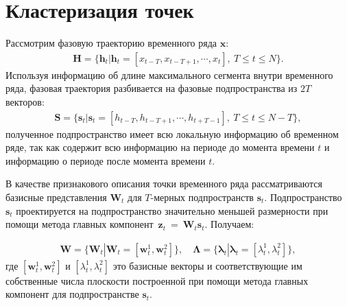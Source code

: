 \documentclass[12pt, twoside]{article}
\numberwithin{equation}{section}
\begin{document}
\section{Кластеризация точек}
Рассмотрим фазовую траекторию временного ряда $\textbf{x}$:
\begin{equation}
\label{eq:cl:1}
\begin{aligned}
\mathbf{H} = \{\textbf{h}_t| \textbf{h}_t = [x_{t-T}, x_{t-T+1}, \cdots, x_{t}],~T\leq t\leq N\}.
\end{aligned}
\end{equation}
Используя информацию об длине максимального сегмента внутри временного ряда, фазовая траектория разбивается на фазовые подпространства из $2T$ векторов:
\begin{equation}
\label{eq:cl:2}
\begin{aligned}
\mathbf{S} = \{\textbf{s}_t| \textbf{s}_t = [h_{t-T}, h_{t-T+1}, \cdots, h_{t+T-1}],~T\leq t\leq N-T\},
\end{aligned}
\end{equation}
полученное подпространство имеет всю локальную информацию об временном ряде, так как содержит всю информацию на периоде до момента времени $t$ и информацию о периоде после момента времени $t$.

В качестве признакового описания точки временного ряда рассматриваются базисные представления $\textbf{W}_t$ для  $T\text{-мерных}$ подпространств $\textbf{s}_t$. Подпространство $\textbf{s}_t$ проектируется на подпространство значительно меньшей размерности при помощи метода главных  компонент~$\textbf{z}_t~=~\textbf{W}_t\textbf{s}_t$. Получаем:

\begin{equation}
\label{eq:cl:3}
\begin{aligned}
\mathbf{W} = \{\textbf{W}_t| \textbf{W}_t = [\textbf{w}^1_t, \textbf{w}^2_t]\}, \quad \bm{\Lambda} = \{\bm{\lambda}_t| \bm{\lambda}_t=[\lambda^1_t, \lambda^2_t]\},
\end{aligned}
\end{equation}
где $[\textbf{w}^1_t, \textbf{w}^2_t]$ и $[\lambda^1_t, \lambda^2_t]$ это базисные векторы и соответствующие им собственные числа плоскости построенной при помощи метода главных компонент для подпространстве $\textbf{s}_t$.
\end{document}
